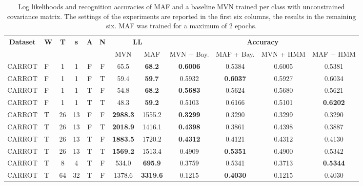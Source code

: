 \documentclass[11pt,titlepage,oneside,openany]{book}
\begin{document}
\begin{table}[H]
	\centering
	\tiny
	\begin{tabular}{c l c c c c c c c c c c}
		\toprule
		\multirow{2}{*}{\bfseries Dataset} & 
		\multirow{2}{*}{\bfseries W} & 
		\multirow{2}{*}{\bfseries T} &
		\multirow{2}{*}{\bfseries s} &
		\multirow{2}{*}{\bfseries A} &
		\multirow{2}{*}{\bfseries N} &
		\multicolumn{2}{c}{\bfseries LL} & 
		\multicolumn{4}{c}{\bfseries Accuracy}\\
		\cmidrule(lr){7-8}
		\cmidrule(lr){9-12}
		& & & & & & MVN & MAF & MVN + Bay. & MAF + Bay. & MVN + HMM & MAF + HMM \\
		\cmidrule(lr){1-12}
		CARROT &   F &       1 &       1 &    F &  F &   65.5 &   \textbf{68.2} &   \textbf{0.6006} &   0.5384 &   0.6005 &   0.5381 \\
		CARROT &   F &       1 &       1 &    F &  T &   59.4 &   \textbf{59.7} &   0.5932 &   \textbf{0.6037} &   0.5927 &   0.6034 \\
		CARROT &   F &       1 &       1 &    T &  F &   54.8 &   \textbf{68.2} &   \textbf{0.5683} &   0.5624 &   0.5680 &   0.5621 \\
		CARROT &   F &       1 &       1 &    T &  T &   48.3 &   \textbf{59.2} &   0.5103 &   0.6166 &   0.5101 &   \textbf{0.6202} \\
		CARROT &   T &      26 &      13 &    F &  F & \textbf{2988.3} & 1555.2 &   \textbf{0.3299} &   0.3290 &   0.3299 &   0.3290 \\
		CARROT &   T &      26 &      13 &    F &  T & \textbf{2018.9} & 1416.1 &   \textbf{0.4398} &   0.3861 &   0.4398 &   0.3887 \\
		CARROT &   T &      26 &      13 &    T &  F & \textbf{1883.5} & 1720.2 &   \textbf{0.4312} &   0.4121 &   0.4312 &   0.4130 \\
		CARROT &   T &      26 &      13 &    T &  T & \textbf{1569.2} & 1513.4 &   0.4909 &   \textbf{0.5351} &   0.4900 &   0.5342 \\
		CARROT &   T &       8 &       4 &    T &  F &  534.0 &  \textbf{695.9} &   0.3759 &   0.5341 &   0.3713 &   \textbf{0.5344} \\
		CARROT &   T &      64 &      32 &    T &  F & 1378.6 & \textbf{3319.6} &   0.1215 &   \textbf{0.4030} &   0.1215 &   0.4030 \\
		\bottomrule
	\end{tabular}
	\caption[Evaluation results Carrot, short]{\label{tab:2eps} Log likelihoods and recognition accuracies of MAF and a baseline MVN trained per class with unconstrained covariance matrix. The settings of the experiments are reported in the first six columns, the results in the remaining six. MAF was trained for a maximum of 2 epochs.}
\end{table}
\end{document}
